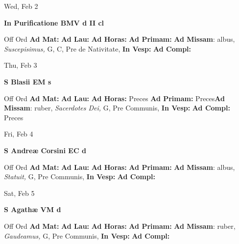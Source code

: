 \documentclass[10pt]{memoir}
\begin{document}
\begin{center}
\begin{minipage}{3.5in}
\vspace{2em}
\begin{center}Wed, Feb 2
\end{center}
\textbf{ \large In Purificatione BMV
\textnormal{\normalsize d II cl}}

\begin{justify}Off Ord
\textbf{Ad Mat: }
\textbf{Ad Lau: }
\textbf{Ad Horas: }
\textbf{Ad Primam: }\textbf{Ad Missam}: albus, \textit{Suscepisimus,} G, C, Pre de Nativitate, 
\textbf{In Vesp: }
\textbf{Ad Compl: }
\end{justify}
\end{minipage}
\end{center}

\begin{center}
\begin{minipage}{3.5in}
\vspace{2em}
\begin{center}Thu, Feb 3
\end{center}
\textbf{ \large S Blasii EM
\textnormal{\normalsize s}}

\begin{justify}Off Ord
\textbf{Ad Mat: }
\textbf{Ad Lau: }
\textbf{Ad Horas: }Preces
\textbf{Ad Primam: }Preces\textbf{Ad Missam}: ruber, \textit{Sacerdotes Dei,} G, Pre Communis, 
\textbf{In Vesp: }
\textbf{Ad Compl: }Preces
\end{justify}
\end{minipage}
\end{center}

\begin{center}
\begin{minipage}{3.5in}
\vspace{2em}
\begin{center}Fri, Feb 4
\end{center}
\textbf{ \large S Andreæ Corsini EC
\textnormal{\normalsize d}}

\begin{justify}Off Ord
\textbf{Ad Mat: }
\textbf{Ad Lau: }
\textbf{Ad Horas: }
\textbf{Ad Primam: }\textbf{Ad Missam}: albus, \textit{Statuit,} G, Pre Communis, 
\textbf{In Vesp: }
\textbf{Ad Compl: }
\end{justify}
\end{minipage}
\end{center}

\begin{center}
\begin{minipage}{3.5in}
\vspace{2em}
\begin{center}Sat, Feb 5
\end{center}
\textbf{ \large S Agathæ VM
\textnormal{\normalsize d}}

\begin{justify}Off Ord
\textbf{Ad Mat: }
\textbf{Ad Lau: }
\textbf{Ad Horas: }
\textbf{Ad Primam: }\textbf{Ad Missam}: ruber, \textit{Gaudeamus,} G, Pre Communis, 
\textbf{In Vesp: }
\textbf{Ad Compl: }
\end{justify}
\end{minipage}
\end{center}
\end{document}
